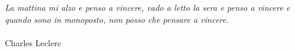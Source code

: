 \chapter*{}
\textit{La mattina mi alzo e penso a vincere, vado a letto la sera e penso a vincere e quando sono in monoposto, non posso che pensare a vincere.}\\\\Charles Leclerc